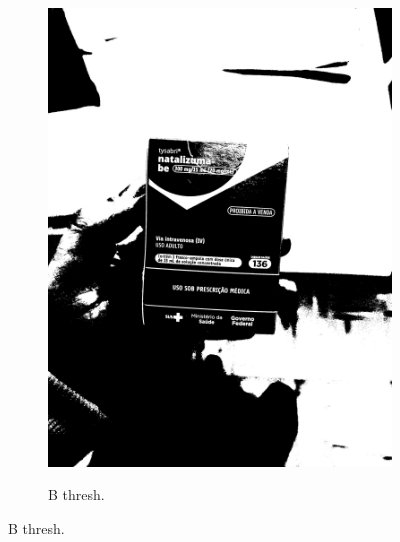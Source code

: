 \begin{figure}[htb]
\begin{subfigure}[t]{0.21\textwidth}
        \includegraphics[width=\linewidth]{../pictures/tysabri_rgb_g_only_thresh.jpg}
    \end{subfigure}
    \hfill
    \begin{subfigure}[t]{0.21\textwidth}
        \centering
        \caption{B thresh.}
        \label{fig:foto:versoes:1:B_thresh}

\end{subfigure}
\end{figure}
